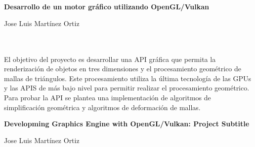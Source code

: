 \chapter*{}






\cleardoublepage
\thispagestyle{empty}

\begin{center}
{\large\bfseries Desarrollo de un motor gráfico utilizando
OpenGL/Vulkan}\\
\end{center}
\begin{center}
Jose Luis Martínez Ortiz\\
\end{center}

\\

\vspace{0.7cm}
\\
El objetivo del proyecto es desarrollar una API gráfica que permita la renderización de objetos en tres dimensiones y el procesamiento geométrico de mallas de triángulos. Este procesamiento utiliza la última tecnología de las GPUs y las APIS de más bajo nivel para permitir realizar el procesamiento geométrico. Para probar la API se plantea una implementación de algoritmos de simplificación geométrica y algoritmos de deformación de mallas.
\cleardoublepage


\thispagestyle{empty}


\begin{center}
{\large\bfseries Developming Graphics Engine with OpenGL/Vulkan: Project Subtitle}\\
\end{center}
\begin{center}
Jose Luis Martínez Ortiz\\
\end{center}

\\


